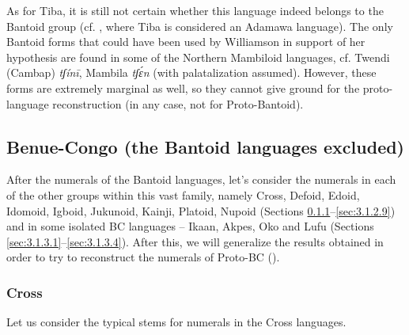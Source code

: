 As for Tiba, it is still not certain whether this language indeed belongs to the Bantoid group (cf. \citealt{Boyd1999}, where Tiba is considered an Adamawa language). The only Bantoid forms that could have been used by Williamson in support of her hypothesis are found in some of the Northern Mambiloid languages, cf. Twendi (Cambap) \textit{tʃínī}, Mambila \textit{tʃ{\'{ɛ}}n} (with palatalization assumed). However, these forms are extremely marginal as well, so they cannot give ground for the proto-language reconstruction (in any case, not for Proto-Bantoid).

 
\subsection{Benue-Congo (the Bantoid languages excluded)}
After the numerals of the Bantoid languages, let's consider the numerals in each of the other groups within this vast family, namely Cross, Defoid, Edoid, Idomoid, Igboid, Jukunoid, Kainji, Platoid, Nupoid (Sections \ref{sec:3.1.2.1}--\ref{sec:3.1.2.9}) and in some isolated BC languages – Ikaan, Akpes, Oko and Lufu (Sections \ref{sec:3.1.3.1}--\ref{sec:3.1.3.4}). After this, we will generalize the results obtained in order to try to reconstruct the numerals of Proto-BC ().


\subsubsection{Cross}\label{sec:3.1.2.1}
Let us consider the typical stems for numerals in the Cross languages. 

